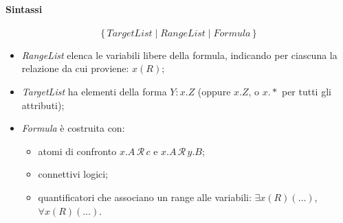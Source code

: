 \documentclass[a4paper,12pt]{article}
\begin{document}
\paragraph{Sintassi}
\[
  \{\, \textit{TargetList} \mid \textit{RangeList} \mid \textit{Formula} \,\}
\]
\begin{itemize}
  \item \emph{RangeList} elenca le variabili libere della formula, indicando
    per ciascuna la relazione da cui proviene: $x(R)$;
  \item \emph{TargetList} ha elementi della forma $Y : x.Z$ (oppure $x.Z$, o
    $x.*$ per tutti gli attributi);
  \item \emph{Formula} è costruita con:
    \begin{itemize}
      \item atomi di confronto $x.A \,\mathcal{R}\, c$ e
        $x.A \,\mathcal{R}\, y.B$;
      \item connettivi logici;
      \item quantificatori che associano un range alle variabili:
        $\exists x(R)(\ldots)$, $\forall x(R)(\ldots)$.
    \end{itemize}
\end{itemize}
\end{document}

